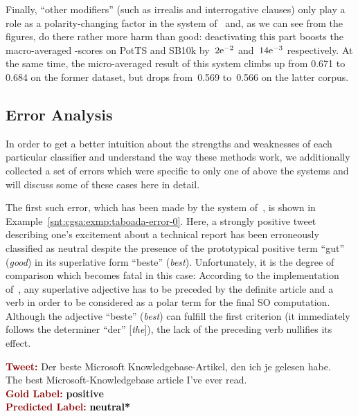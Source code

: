 Finally, ``other modifiers'' (such as irrealis and interrogative
clauses) only play a role as a polarity-changing factor in the system
of~\citet{Taboada:11} and, as we can see from the figures, do there
rather more harm than good: deactivating this part boosts the
macro-averaged \F{}-scores on PotTS and SB10k by~${2}\mathrm{e}^{-2}$
and~${14}\mathrm{e}^{-3}$ respectively.  At the same time, the
micro-averaged result of this system climbs up from 0.671 to 0.684 on
the former dataset, but drops from~0.569 to~0.566 on the latter
corpus.

\subsection{Error Analysis}\label{subsec:cgsa:lex-methods:err-analysis}

In order to get a better intuition about the strengths and weaknesses
of each particular classifier and understand the way these methods
work, we additionally collected a set of errors which were specific to
only one of above the systems and will discuss some of these cases
here in detail.

The first such error, which has been made by the system
of~\citet{Taboada:11}, is shown in
Example~\ref{snt:cgsa:exmp:taboada-error-0}.  Here, a strongly
positive tweet describing one's excitement about a technical report
has been erroneously classified as neutral despite the presence of the
prototypical positive term ``gut'' (\emph{good}) in its superlative
form ``beste'' (\emph{best}).  Unfortunately, it is the degree of
comparison which becomes fatal in this case: According to the
implementation of~\citet{Taboada:11}, any superlative adjective has to
be preceded by the definite article and a verb in order to be
considered as a polar term for the final SO computation. Although the
adjective ``beste'' (\emph{best}) can fulfill the first criterion (it
immediately follows the determiner ``der'' [\emph{the}]), the lack of
the preceding verb nullifies its effect.

\begin{example}\label{snt:cgsa:exmp:taboada-error-0}
  \noindent\textup{\bfseries\textcolor{darkred}{Tweet:}} {\upshape Der beste Microsoft Knowledgebase-Artikel, den ich je gelesen habe.}\\
  \noindent The best Microsoft-Knowledgebase article I've ever read.\\[\exampleSep]
  \noindent\textup{\bfseries\textcolor{darkred}{Gold Label:}}\hspace*{4.3em}\textbf{%
    \upshape\textcolor{green3}{positive}}\\
 \noindent\textup{\bfseries\textcolor{darkred}{Predicted Label:}}\hspace*{2em}\textbf{%
    \upshape\textcolor{black}{neutral*}}
\end{example}

